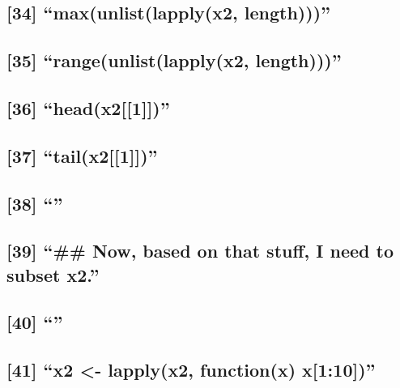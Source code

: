 \documentclass[]{article}
\begin{document}
\subsection{\texorpdfstring{{[}34{]} ``max(unlist(lapply(x2,
length)))''}{{[}34{]} max(unlist(lapply(x2, length)))}}\label{maxunlistlapplyx2-length}

\subsection{\texorpdfstring{{[}35{]} ``range(unlist(lapply(x2,
length)))''}{{[}35{]} range(unlist(lapply(x2, length)))}}\label{rangeunlistlapplyx2-length}

\subsection{\texorpdfstring{{[}36{]}
``head(x2{[}{[}1{]}{]})''}{{[}36{]} head(x2{[}{[}1{]}{]})}}\label{headx21}

\subsection{\texorpdfstring{{[}37{]}
``tail(x2{[}{[}1{]}{]})''}{{[}37{]} tail(x2{[}{[}1{]}{]})}}\label{tailx21}

\subsection{\texorpdfstring{{[}38{]} ``''}{{[}38{]} }}\label{section-8}

\subsection{\texorpdfstring{{[}39{]} ``\#\# Now, based on that stuff, I
need to subset
x2.''}{{[}39{]} \#\# Now, based on that stuff, I need to subset x2.}}\label{now-based-on-that-stuff-i-need-to-subset-x2.}

\subsection{\texorpdfstring{{[}40{]} ``''}{{[}40{]} }}\label{section-9}

\subsection{\texorpdfstring{{[}41{]} ``x2 \textless{}- lapply(x2,
function(x)
x{[}1:10{]})''}{{[}41{]} x2 \textless{}- lapply(x2, function(x) x{[}1:10{]})}}\label{x2---lapplyx2-functionx-x110}
\end{document}
